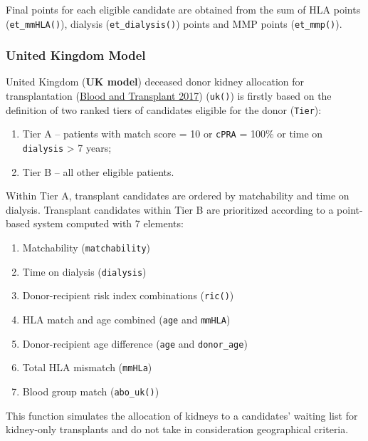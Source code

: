 \documentclass[
]{article}
\providecommand{\tightlist}{%
  \setlength{\itemsep}{0pt}\setlength{\parskip}{0pt}}
\begin{document}
Final points for each eligible candidate are obtained from the sum of
HLA points (\texttt{et\_mmHLA()}), dialysis (\texttt{et\_dialysis()})
points and MMP points (\texttt{et\_mmp()}).

\hypertarget{united-kingdom-model}{%
\subsubsection{United Kingdom Model}\label{united-kingdom-model}}

United Kingdom (\textbf{UK model}) deceased donor kidney allocation for
transplantation (\protect\hyperlink{ref-UK}{Blood and Transplant 2017})
(\texttt{uk()}) is firstly based on the definition of two ranked tiers
of candidates eligible for the donor (\texttt{Tier}):

\begin{enumerate}
\def\labelenumi{\arabic{enumi}.}
\tightlist
\item
  Tier A -- patients with match score = 10 or \texttt{cPRA} = 100\% or
  time on \texttt{dialysis} \textgreater{} 7 years;
\item
  Tier B -- all other eligible patients.
\end{enumerate}

Within Tier A, transplant candidates are ordered by matchability and
time on dialysis. Transplant candidates within Tier B are prioritized
according to a point-based system computed with 7 elements:

\begin{enumerate}
\def\labelenumi{\arabic{enumi}.}
\tightlist
\item
  Matchability (\texttt{matchability})
\item
  Time on dialysis (\texttt{dialysis})
\item
  Donor-recipient risk index combinations (\texttt{ric()})
\item
  HLA match and age combined (\texttt{age} and \texttt{mmHLA})
\item
  Donor-recipient age difference (\texttt{age} and \texttt{donor\_age})
\item
  Total HLA mismatch (\texttt{mmHLa})
\item
  Blood group match (\texttt{abo\_uk()})
\end{enumerate}

This function simulates the allocation of kidneys to a candidates'
waiting list for kidney-only transplants and do not take in
consideration geographical criteria.
\end{document}
